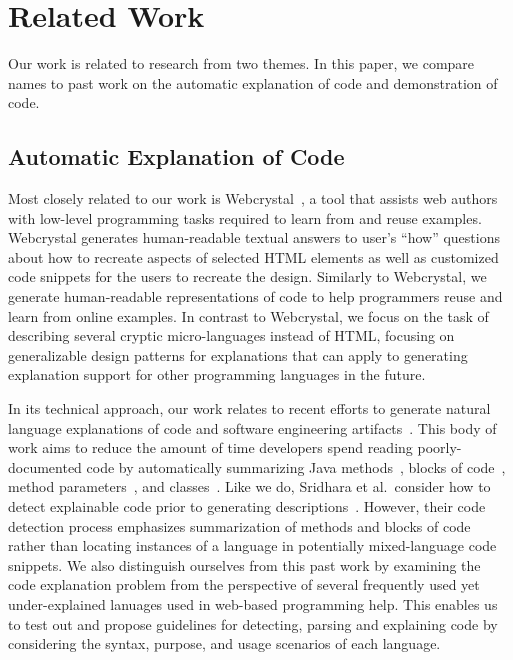 \section{Related Work}

Our work is related to research from two themes.
In this paper, we compare \Glspl{name} to past work on the automatic explanation of code and demonstration of code.

\subsection{Automatic Explanation of Code}

Most closely related to our work is Webcrystal~\cite{chang_webcrystal_2012}, a tool that assists web authors with low-level programming tasks required to learn from and reuse examples.  
Webcrystal generates human-readable textual answers to user's ``how'' questions about how to recreate aspects of selected HTML elements as well as customized code snippets for the users to recreate the design.
Similarly to Webcrystal, we generate human-readable representations of code to help programmers reuse and learn from online examples.
In contrast to Webcrystal, we focus on the task of describing several cryptic micro-languages instead of HTML, focusing on generalizable design patterns for explanations that can apply to generating explanation support for other programming languages in the future.

In its technical approach, our work relates to recent efforts to generate natural language explanations of code and software engineering artifacts~\cite{sridhara_automatically_2011,burden_natural_2011,sridhara_towards_2010,kamimura_towards_2013,mcburney_automatic_2014,sridhara_generating_2011,haiduc_supporting_2010,moreno_automatic_2013}.
This body of work aims to reduce the amount of time developers spend reading poorly-documented code by automatically summarizing Java methods~\cite{sridhara_towards_2010}, blocks of code~\cite{sridhara_automatically_2011}, method parameters~\cite{sridhara_generating_2011}, and classes~\cite{moreno_automatic_2013}.
Like we do, Sridhara et al.\ consider how to detect explainable code prior to generating descriptions~\cite{sridhara_automatically_2011,sridhara_towards_2010}.
However, their code detection process emphasizes summarization of methods and blocks of code rather than locating instances of a language in potentially mixed-language code snippets.
We also distinguish ourselves from this past work by examining the code explanation problem from the perspective of several frequently used yet under-explained lanuages used in web-based programming help.
This enables us to test out and propose guidelines for detecting, parsing and explaining code by considering the syntax, purpose, and usage scenarios of each language.

